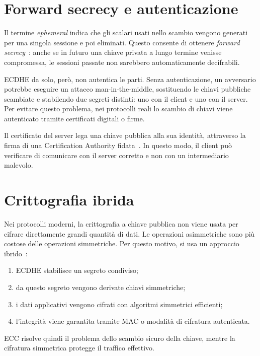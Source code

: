 \documentclass[12pt,a4paper,oneside]{report}
\begin{document}
\section{Forward secrecy e autenticazione}

Il termine \textit{ephemeral} indica che gli scalari usati nello scambio vengono generati per una singola sessione e poi eliminati. Questo consente di ottenere \textit{forward secrecy}~\cite{margara_ssl}: anche se in futuro una chiave privata a lungo termine venisse compromessa, le sessioni passate non sarebbero automaticamente decifrabili.

ECDHE da solo, però, non autentica le parti. Senza autenticazione, un avversario potrebbe eseguire un attacco man-in-the-middle, sostituendo le chiavi pubbliche scambiate e stabilendo due segreti distinti: uno con il client e uno con il server. Per evitare questo problema, nei protocolli reali lo scambio di chiavi viene autenticato tramite certificati digitali o firme.

Il certificato del server lega una chiave pubblica alla sua identità, attraverso la firma di una Certification Authority fidata~\cite{margara_ssl}. In questo modo, il client può verificare di comunicare con il server corretto e non con un intermediario malevolo.

\section{Crittografia ibrida}

Nei protocolli moderni, la crittografia a chiave pubblica non viene usata per cifrare direttamente grandi quantità di dati. Le operazioni asimmetriche sono più costose delle operazioni simmetriche. Per questo motivo, si usa un approccio ibrido~\cite{margara_ssl}:

\begin{enumerate}
    \item ECDHE stabilisce un segreto condiviso;
    \item da questo segreto vengono derivate chiavi simmetriche;
    \item i dati applicativi vengono cifrati con algoritmi simmetrici efficienti;
    \item l'integrità viene garantita tramite MAC o modalità di cifratura autenticata.
\end{enumerate}

ECC risolve quindi il problema dello scambio sicuro della chiave, mentre la cifratura simmetrica protegge il traffico effettivo.
\end{document}
